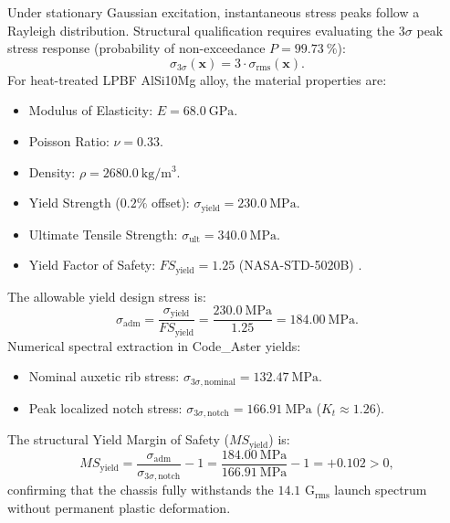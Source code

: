 Under stationary Gaussian excitation, instantaneous stress peaks follow a Rayleigh distribution. Structural qualification requires evaluating the $3\sigma$ peak stress response (probability of non-exceedance $P = \SI{99.73}{\percent}$):
\begin{equation}
\sigma_{3\sigma}(\mathbf{x}) = 3 \cdot \sigma_{\text{rms}}(\mathbf{x}).
\label{eq:sigma_3sigma}
\end{equation}
For heat-treated LPBF AlSi10Mg alloy, the material properties are:
\begin{itemize}
\item Modulus of Elasticity: $E = \SI{68.0}{\giga\pascal}$.
\item Poisson Ratio: $\nu = 0.33$.
\item Density: $\rho = \SI{2680.0}{\kilo\gram/\meter^3}$.
\item Yield Strength ($0.2\%$ offset): $\sigma_{\text{yield}} = \SI{230.0}{\mega\pascal}$.
\item Ultimate Tensile Strength: $\sigma_{\text{ult}} = \SI{340.0}{\mega\pascal}$.
\item Yield Factor of Safety: $FS_{\text{yield}} = 1.25$ (NASA-STD-5020B) \cite{nasa2022}.
\end{itemize}

The allowable yield design stress is:
\begin{equation}
\sigma_{\text{adm}} = \frac{\sigma_{\text{yield}}}{FS_{\text{yield}}} = \frac{\SI{230.0}{\mega\pascal}}{1.25} = \SI{184.00}{\mega\pascal}.
\label{eq:sigma_adm}
\end{equation}
Numerical spectral extraction in Code\_Aster yields:
\begin{itemize}
\item Nominal auxetic rib stress: $\sigma_{3\sigma,\text{nominal}} = \SI{132.47}{\mega\pascal}$.
\item Peak localized notch stress: $\sigma_{3\sigma,\text{notch}} = \SI{166.91}{\mega\pascal}$ ($K_t \approx 1.26$).
\end{itemize}
The structural Yield Margin of Safety ($MS_{\text{yield}}$) is:
\begin{equation}
MS_{\text{yield}} = \frac{\sigma_{\text{adm}}}{\sigma_{3\sigma,\text{notch}}} - 1 = \frac{\SI{184.00}{\mega\pascal}}{\SI{166.91}{\mega\pascal}} - 1 = \mathbf{+0.102} > 0,
\label{eq:margin_safety}
\end{equation}
confirming that the chassis fully withstands the $14.1\text{ G}_{\text{rms}}$ launch spectrum without permanent plastic deformation.

